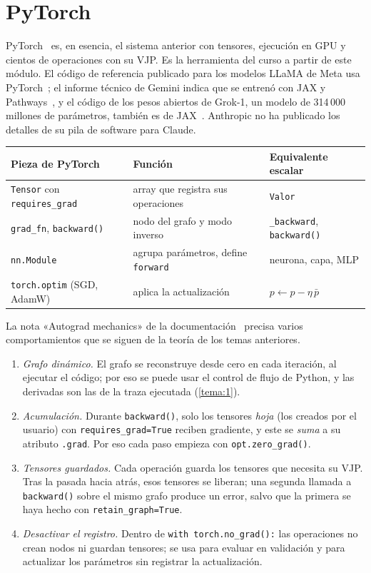 \section{PyTorch}

PyTorch~\cite{paszke} es, en esencia, el sistema anterior con tensores, ejecución en GPU y cientos de operaciones con su VJP. Es la herramienta del curso a partir de este módulo. El código de referencia publicado para los modelos LLaMA de Meta usa PyTorch~\cite{llama}; el informe técnico de Gemini indica que se entrenó con JAX y Pathways~\cite{gemini}, y el código de los pesos abiertos de Grok-1, un modelo de 314\,000 millones de parámetros, también es de JAX~\cite{grok}. Anthropic no ha publicado los detalles de su pila de software para Claude.

\begin{center}\small
\begin{tabular}{@{}lll@{}}
\toprule
Pieza de PyTorch & Función & Equivalente escalar \\
\midrule
\texttt{Tensor} con \texttt{requires\_grad} & array que registra sus operaciones & \texttt{Valor} \\
\texttt{grad\_fn}, \texttt{backward()} & nodo del grafo y modo inverso & \texttt{\_backward}, \texttt{backward()} \\
\texttt{nn.Module} & agrupa parámetros, define \texttt{forward} & neurona, capa, MLP \\
\texttt{torch.optim} (SGD, AdamW) & aplica la actualización & $p\gets p-\eta\,\bar p$ \\
\bottomrule
\end{tabular}
\end{center}

La nota «Autograd mechanics» de la documentación~\cite{pytorch} precisa varios comportamientos que se siguen de la teoría de los temas anteriores.
\begin{enumerate}[label=(\alph*)]
  \item \emph{Grafo dinámico.} El grafo se reconstruye desde cero en cada iteración, al ejecutar el código; por eso se puede usar el control de flujo de Python, y las derivadas son las de la traza ejecutada (\cref{tema:1}).
  \item \emph{Acumulación.} Durante \texttt{backward()}, solo los tensores \emph{hoja} (los creados por el usuario) con \texttt{requires\_grad=True} reciben gradiente, y este se \emph{suma} a su atributo \texttt{.grad}. Por eso cada paso empieza con \texttt{opt.zero\_grad()}.
  \item \emph{Tensores guardados.} Cada operación guarda los tensores que necesita su VJP. Tras la pasada hacia atrás, esos tensores se liberan; una segunda llamada a \texttt{backward()} sobre el mismo grafo produce un error, salvo que la primera se haya hecho con \texttt{retain\_graph=True}.
  \item \emph{Desactivar el registro.} Dentro de \texttt{with torch.no\_grad():} las operaciones no crean nodos ni guardan tensores; se usa para evaluar en validación y para actualizar los parámetros sin registrar la actualización.
\end{enumerate}

